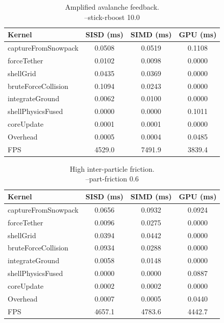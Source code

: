 \begin{table}[H]
  \caption{\centering Amplified avalanche feedback. \\ \centering --stick-rboost 10.0}
  \label{tab:gtx_scenario3_timing}
  \centering
  \scriptsize
  \begin{tabular}{@{}lccc@{}}
    \toprule
    \textbf{Kernel} & \textbf{SISD (ms)} & \textbf{SIMD (ms)} & \textbf{GPU (ms)} \\
    \midrule
    captureFromSnowpack           & 0.0508 & 0.0519 & 0.1108 \\
    forceTether                   & 0.0102 & 0.0098 & 0.0000 \\
    shellGrid                     & 0.0435 & 0.0369 & 0.0000 \\
    bruteForceCollision           & 0.1094 & 0.0243 & 0.0000 \\
    integrateGround               & 0.0062 & 0.0100 & 0.0000 \\
    shellPhysicsFused             & 0.0000 & 0.0000 & 0.1011 \\
    coreUpdate                    & 0.0001 & 0.0001 & 0.0000 \\
    Overhead                      & 0.0005 & 0.0004 & 0.0485 \\
    \bottomrule
    FPS                           & 4529.0 & 7491.9 & 3839.4
  \end{tabular}
\end{table}

\begin{table}[H]
  \caption{High inter-particle friction. \\ --part-friction 0.6}
  \label{tab:gtx_scenario4_timing}
  \centering
  \scriptsize
  \begin{tabular}{@{}lccc@{}}
    \toprule
    \textbf{Kernel} & \textbf{SISD (ms)} & \textbf{SIMD (ms)} & \textbf{GPU (ms)} \\
    \midrule
    captureFromSnowpack           & 0.0656 & 0.0932 & 0.0924 \\
    forceTether                   & 0.0096 & 0.0275 & 0.0000 \\
    shellGrid                     & 0.0394 & 0.0442 & 0.0000 \\
    bruteForceCollision           & 0.0934 & 0.0288 & 0.0000 \\
    integrateGround               & 0.0058 & 0.0148 & 0.0000 \\
    shellPhysicsFused             & 0.0000 & 0.0000 & 0.0887 \\
    coreUpdate                    & 0.0002 & 0.0002 & 0.0000 \\
    Overhead                      & 0.0007 & 0.0005 & 0.0440 \\
    \bottomrule
    FPS                           & 4657.1 & 4783.6 & 4442.7
  \end{tabular}
\end{table}

